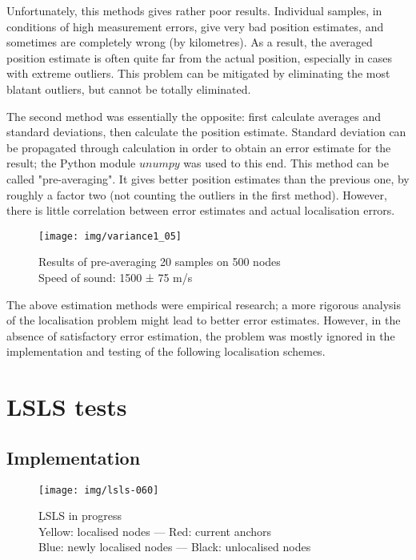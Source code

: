 \documentclass[12pt,a4paper,fleqn]{report}
\begin{document}
Unfortunately, this methods gives rather poor results. Individual samples, in conditions of high measurement errors, give very bad position estimates, and sometimes are completely wrong (by kilometres). As a result, the averaged position estimate is often quite far from the actual position, especially in cases with extreme outliers. This problem can be mitigated by eliminating the most blatant outliers, but cannot be totally eliminated.

The second method was essentially the opposite: first calculate averages and standard deviations, then calculate the position estimate. Standard deviation can be propagated through calculation in order to obtain an error estimate for the result; the Python module $unumpy$ was used to this end. This method can be called "pre-averaging". It gives better position estimates than the previous one, by roughly a factor two (not counting the outliers in the first method). However, there is little correlation between error estimates and actual localisation errors.

\begin{figure}[h]
	\centering
	\texttt{[image: img/variance1\_05]}
	\caption{%
	Results of pre-averaging 20 samples on 500 nodes \\
	Speed of sound: 1500 ± 75 m/s
	}
\end{figure}

The above estimation methods were empirical research; a more rigorous analysis of the localisation problem might lead to better error estimates. However, in the absence of satisfactory error estimation, the problem was mostly ignored in the implementation and testing of the following localisation schemes.

\section{LSLS tests}

\subsection{Implementation}

\begin{figure}[h]
	\centering
	\texttt{[image: img/lsls-060]}
	\caption{%
	LSLS in progress \\
	Yellow: localised nodes —
	Red: current anchors \\
	Blue: newly localised nodes —
	Black: unlocalised nodes
	}
\end{figure}
\end{document}
